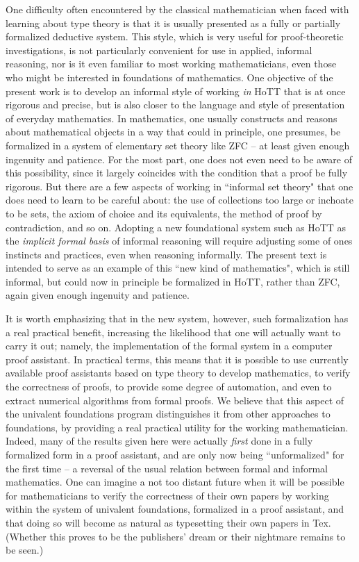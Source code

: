 {One difficulty often encountered by the classical mathematician when faced with learning about type theory is that it is usually presented as a fully or partially formalized deductive system.  This style, which is very useful for proof-theoretic investigations, is not particularly convenient for use in applied, informal reasoning, nor is it even familiar to most working mathematicians, even those who might be interested in foundations of mathematics.  One objective of the present work is to develop an informal style of working \emph{in} HoTT that is at once rigorous and precise, but is also closer to the language and style of presentation of everyday mathematics.    In mathematics, one usually constructs and reasons about mathematical objects in a way that could in principle, one presumes, be formalized in a system of elementary set theory like ZFC -- at least given enough ingenuity and patience.  For the most part, one does not even need to be aware of this possibility, since it largely coincides with the condition that a proof be fully rigorous.  But there are a few aspects of working in ``informal set theory" that one does need to learn to be careful about: the use of collections too large or inchoate to  be sets, the axiom of choice and its equivalents,  the method of proof by contradiction, and so on.  Adopting a new foundational system such as HoTT as the \emph{implicit formal basis} of informal reasoning will require adjusting some of ones instincts and practices, even when reasoning informally.  The present text is intended to serve as an example of this ``new kind of mathematics", which is still informal, but could now in principle be formalized in HoTT, rather than ZFC, again given enough ingenuity and patience.

It is worth emphasizing that in the new system, however, such formalization has a real practical benefit, increasing the likelihood that one will actually want to carry it out; namely, the implementation of the formal system in a computer proof assistant.  In practical terms, this means that it is possible to use currently available proof assistants based on type theory to develop mathematics, to verify the correctness of proofs, to provide some degree of automation, and even to extract numerical algorithms from formal proofs.  We believe that this aspect of the univalent foundations program distinguishes it from other approaches to foundations, by providing a real practical utility for the working mathematician. Indeed, many of the results given here were actually \emph{first} done in a fully formalized form in a proof assistant, and are only now being ``unformalized" for the first time -- a reversal of the usual relation between formal and informal mathematics.   One can imagine a not too distant future when it will be possible for mathematicians  to verify the correctness of their own papers by working within the system of univalent foundations, formalized in a proof assistant, and that doing so will become as natural as typesetting their own papers in Tex. (Whether this proves to be the publishers' dream or their nightmare  remains to be seen.) 

}
